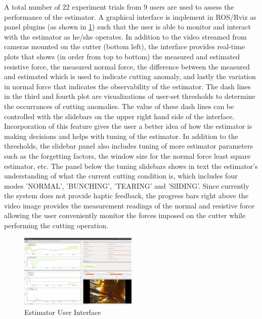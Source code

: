 \documentclass[letterpaper, 10 pt, conference]{ieeeconf}  %
\begin{document}
A total number of 22 experiment trials from 9 users are used to assess the performance of the estimator. A graphical interface is implement in ROS/Rviz as panel plugins (as shown in \ref{fig:4}) such that the user is able to monitor and interact with the estimator as he/she operates. In addition to the video streamed from cameras mounted on the cutter (bottom left), the interface provides real-time plots that shows (in order from top to bottom) the measured and estimated resistive force, the measured normal force, the difference between the measured and estimated which is used to indicate cutting anomaly, and lastly the variation in normal force that indicates the observability of the estimator. The dash lines in the third and fourth plot are visualizations of user-set thresholds to determine the occurrances of cutting anomalies. The value of these dash lines can be controlled with the slidebars on the upper right hand side of the interface. Incorporation of this feature gives the user a better idea of how the estimator is making decisions and helps with tuning of the estimator. In addition to the thresholds, the slidebar panel also includes tuning of more estimator parameters such as the forgetting factors, the window size for the normal force least square estimator, etc. The panel below the tuning slidebars shows in text the estimator's understanding of what the current cutting condition is, which includes four modes 'NORMAL', 'BUNCHING', 'TEARING' and 'SlIDING'. Since currently the system does not provide haptic feedback, the progress bars right above the video image provides the measurement readings of the normal and resistive force allowing the user conveniently monitor the forces imposed on the cutter while performing the cutting operation.      

\begin{figure}[htbp]
\begin{center}
\includegraphics[width=0.5\textwidth]{figures/UI.png}
\caption{Estimator User Interface }
\label{fig:4}
\end{center}
\end{figure}
 
\end{document}
